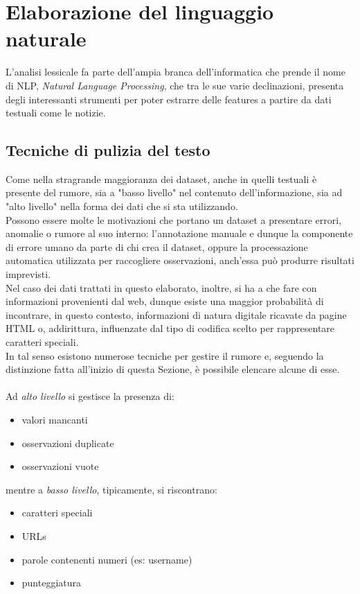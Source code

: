 \documentclass[12pt]{report}
\theoremstyle{definition}
\begin{document}
\section{Elaborazione del linguaggio naturale} \label{nlp}
L'analisi lessicale fa parte dell'ampia branca dell'informatica che prende il nome di NLP, \textit{Natural Language Processing}, che tra le sue varie declinazioni, presenta degli interessanti strumenti per poter estrarre delle features a partire da dati testuali come le notizie.


\subsection{Tecniche di pulizia del testo} \label{clean}
Come nella stragrande maggioranza dei dataset, anche in quelli testuali è presente del rumore, sia a "basso livello" nel contenuto dell'informazione, sia ad "alto livello" nella forma dei dati che si sta utilizzando.
\\
Possono essere molte le motivazioni che portano un dataset a presentare errori, anomalie o rumore al suo interno: 
l'annotazione manuale e dunque la componente di errore umano da parte di chi crea il dataset, oppure la processazione automatica utilizzata per raccogliere osservazioni, anch'essa può produrre risultati imprevisti.
\\
Nel caso dei dati trattati in questo elaborato, inoltre, si ha a che fare con informazioni provenienti dal web, dunque esiste una maggior probabilità di incontrare, in questo contesto, informazioni di natura digitale ricavate da pagine HTML o, addirittura, influenzate dal tipo di codifica scelto per rappresentare caratteri speciali.
\\
In tal senso esistono numerose tecniche per gestire il rumore e, seguendo la distinzione fatta all'inizio di questa Sezione, è possibile elencare alcune di esse.
\\
\\
Ad \textit{alto livello} si gestisce la presenza di:
\begin{itemize}
    \item valori mancanti
    \item osservazioni duplicate
    \item osservazioni vuote
\end{itemize}

mentre a \textit{basso livello}, tipicamente, si riscontrano:
\begin{itemize}
    \item caratteri speciali
    \item URLs
    \item parole contenenti numeri (es: username)
    \item punteggiatura
\end{itemize}
\end{document}
